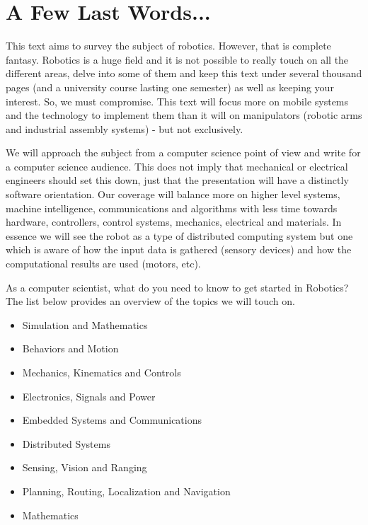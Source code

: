 \hypertarget{a-few-last-words...}{%
\section{A Few Last Words...}\label{a-few-last-words...}}

This text aims to survey the subject of robotics. However, that is
complete fantasy. Robotics is a huge field and it is not possible to
really touch on all the different areas, delve into some of them and
keep this text under several thousand pages (and a university course
lasting one semester) as well as keeping your interest. So, we must
compromise. This text will focus more on mobile systems and the
technology to implement them than it will on manipulators (robotic arms
and industrial assembly systems) - but not exclusively.

We will approach the subject from a computer science point of view and
write for a computer science audience. This does not imply that
mechanical or electrical engineers should set this down, just that the
presentation will have a distinctly software orientation. Our coverage
will balance more on higher level systems, machine intelligence,
communications and algorithms with less time towards hardware,
controllers, control systems, mechanics, electrical and materials. In
essence we will see the robot as a type of distributed computing system
but one which is aware of how the input data is gathered (sensory
devices) and how the computational results are used (motors, etc).

As a computer scientist, what do you need to know to get started in
Robotics? The list below provides an overview of the topics we will
touch on.

\begin{itemize}
\tightlist
\item
  Simulation and Mathematics
\item
  Behaviors and Motion
\item
  Mechanics, Kinematics and Controls
\item
  Electronics, Signals and Power
\item
  Embedded Systems and Communications
\item
  Distributed Systems
\item
  Sensing, Vision and Ranging
\item
  Planning, Routing, Localization and Navigation
\item
  Mathematics
\end{itemize}

